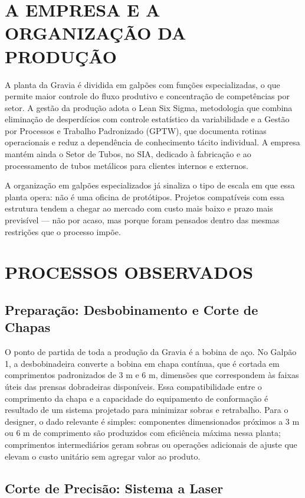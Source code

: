 \documentclass[12pt,a4paper,oneside,brazil,chapter=TITLE]{article}
\newcommand{\secbreak}{\clearpage}
\let\oldsection\section
\renewcommand{\section}{\secbreak\oldsection}
\begin{document}
\section{A EMPRESA E A ORGANIZAÇÃO DA PRODUÇÃO}

A planta da Gravia é dividida em galpões com funções especializadas, o que permite maior controle do fluxo produtivo e concentração de competências por setor. A gestão da produção adota o Lean Six Sigma, metodologia que combina eliminação de desperdícios com controle estatístico da variabilidade e a Gestão por Processos e Trabalho Padronizado (GPTW), que documenta rotinas operacionais e reduz a dependência de conhecimento tácito individual. A empresa mantém ainda o Setor de Tubos, no SIA, dedicado à fabricação e ao processamento de tubos metálicos para clientes internos e externos.

A organização em galpões especializados já sinaliza o tipo de escala em que essa planta opera: não é uma oficina de protótipos. Projetos compatíveis com essa estrutura tendem a chegar ao mercado com custo mais baixo e prazo mais previsível — não por acaso, mas porque foram pensados dentro das mesmas restrições que o processo impõe.

\section{PROCESSOS OBSERVADOS}

\subsection{Preparação: Desbobinamento e Corte de Chapas}

O ponto de partida de toda a produção da Gravia é a bobina de aço. No Galpão 1, a desbobinadeira converte a bobina em chapa contínua, que é cortada em comprimentos padronizados de 3 m e 6 m, dimensões que correspondem às faixas úteis das prensas dobradeiras disponíveis. Essa compatibilidade entre o comprimento da chapa e a capacidade do equipamento de conformação é resultado de um sistema projetado para minimizar sobras e retrabalho. Para o designer, o dado relevante é simples: componentes dimensionados próximos a 3 m ou 6 m de comprimento são produzidos com eficiência máxima nessa planta; comprimentos intermediários geram sobras ou operações adicionais de ajuste que elevam o custo unitário sem agregar valor ao produto.

\subsection{Corte de Precisão: Sistema a Laser}
\end{document}
